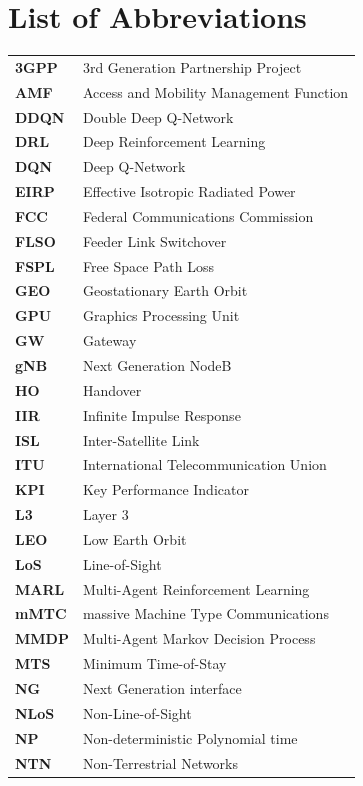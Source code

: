 \chapter*{List of Abbreviations}

\begin{flushleft}
\begin{longtable}{l p{}}

\bf{3GPP}&{3rd Generation Partnership Project}\\
\bf{AMF}&{Access and Mobility Management Function}\\
\bf{DDQN}&{Double Deep Q-Network}\\
\bf{DRL}&{Deep Reinforcement Learning}\\
\bf{DQN}&{Deep Q-Network}\\
\bf{EIRP}&{Effective Isotropic Radiated Power}\\
\bf{FCC}&{Federal Communications Commission}\\
\bf{FLSO}&{Feeder Link Switchover}\\
\bf{FSPL}&{Free Space Path Loss}\\
\bf{GEO}&{Geostationary Earth Orbit}\\
\bf{GPU}&{Graphics Processing Unit}\\
\bf{GW}&{Gateway}\\
\bf{gNB}&{Next Generation NodeB}\\
\bf{HO}&{Handover}\\
\bf{IIR}&{Infinite Impulse Response}\\
\bf{ISL}&{Inter-Satellite Link}\\
\bf{ITU}&{International Telecommunication Union}\\
\bf{KPI}&{Key Performance Indicator}\\
\bf{L3}&{Layer 3}\\
\bf{LEO}&{Low Earth Orbit}\\
\bf{LoS}&{Line-of-Sight}\\
\bf{MARL}&{Multi-Agent Reinforcement Learning}\\
\bf{mMTC}&{massive Machine Type Communications}\\
\bf{MMDP}&{Multi-Agent Markov Decision Process}\\
\bf{MTS}&{Minimum Time-of-Stay}\\
\bf{NG}&{Next Generation interface}\\
\bf{NLoS}&{Non-Line-of-Sight}\\
\bf{NP}&{Non-deterministic Polynomial time}\\
\bf{NTN}&{Non-Terrestrial Networks}\\

\end{longtable}
\end{flushleft}
